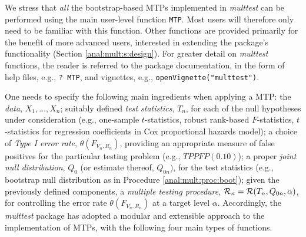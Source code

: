 \documentclass[11pt]{article}
\newcommand{\Rpackage}[1]{\textit{#1}}
\newcommand{\Robject}[1]{\texttt{#1}}
\begin{document}
We stress that {\em all} the bootstrap-based MTPs implemented in \Rpackage{multtest} can be performed using the main user-level function \Robject{MTP}. 
Most users will therefore only need to be familiar with this function. 
Other functions are provided primarily for the benefit of more advanced users, interested in extending the package's functionality (Section \ref{anal:mult:s:design}).
For greater detail on \Rpackage{multtest} functions, the reader is referred to the package documentation, in the form of help files, e.g., \Robject{? MTP}, and vignettes, e.g., \Robject{openVignette("multtest")}. 

One needs to specify the following main ingredients when applying a MTP: 
the {\em data}, $X_1, \ldots, X_n$; 
suitably defined {\em test statistics}, $T_n$, for each of the null hypotheses under consideration (e.g., one-sample $t$-statistics, robust rank-based $F$-statistics, $t$-statistics for regression coefficients in Cox proportional hazards model); 
a choice of {\em Type I error rate}, $\theta(F_{V_n,R_n})$, providing an appropriate measure of false positives for the particular testing problem (e.g., $TPPFP(0.10)$);
a proper {\em joint null distribution}, $Q_0$ (or estimate thereof, $Q_{0n})$, for the test statistics (e.g., bootstrap null distribution as in Procedure \ref{anal:mult:proc:boot}); 
given the previously defined components, a {\em multiple testing procedure}, ${\cal R}_n={\cal R}(T_n, Q_{0n},\alpha)$, for controlling the error rate $\theta(F_{V_n,R_n})$ at a target level $\alpha$.
Accordingly, the \Rpackage{multtest} package has adopted a modular and extensible approach to the implementation of MTPs, with the following four main types of functions.
\end{document}
